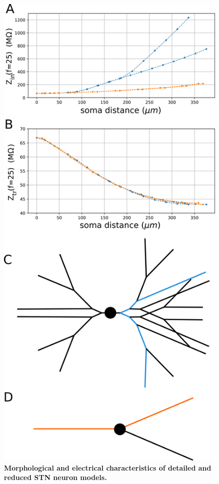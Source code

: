 \begin{figure}[ht]
\centering
\includegraphics[height=\dimexpr \textheight - 9\baselineskip\relax]{ch_reduced_model/figs/fig_stn-full-vs-red_Zin-Ztr.png}
\caption{
\textbf{Morphological and electrical characteristics of detailed and reduced STN neuron models.}
}
\end{figure}
